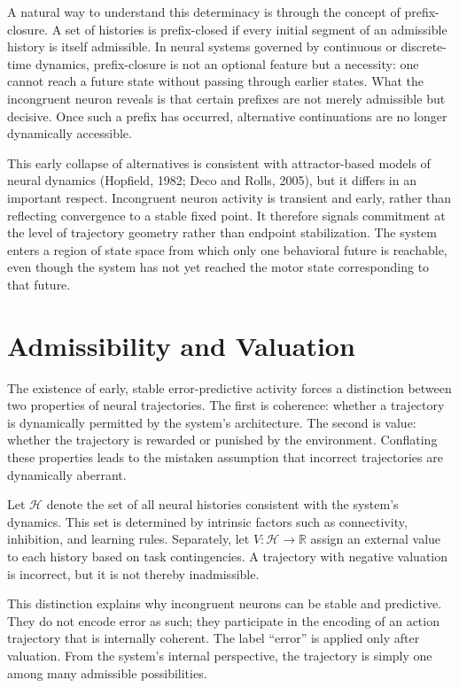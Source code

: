\documentclass[11pt]{article}
\newcommand{\histories}{\mathcal{H}}
\newcommand{\valuation}{V}
\begin{document}
A natural way to understand this determinacy is through the concept of prefix-closure. A set of histories is prefix-closed if every initial segment of an admissible history is itself admissible. In neural systems governed by continuous or discrete-time dynamics, prefix-closure is not an optional feature but a necessity: one cannot reach a future state without passing through earlier states. What the incongruent neuron reveals is that certain prefixes are not merely admissible but decisive. Once such a prefix has occurred, alternative continuations are no longer dynamically accessible.

This early collapse of alternatives is consistent with attractor-based models of neural dynamics (Hopfield, 1982; Deco and Rolls, 2005), but it differs in an important respect. Incongruent neuron activity is transient and early, rather than reflecting convergence to a stable fixed point. It therefore signals commitment at the level of trajectory geometry rather than endpoint stabilization. The system enters a region of state space from which only one behavioral future is reachable, even though the system has not yet reached the motor state corresponding to that future.

\section{Admissibility and Valuation}

The existence of early, stable error-predictive activity forces a distinction between two properties of neural trajectories. The first is coherence: whether a trajectory is dynamically permitted by the system’s architecture. The second is value: whether the trajectory is rewarded or punished by the environment. Conflating these properties leads to the mistaken assumption that incorrect trajectories are dynamically aberrant.

Let $\histories$ denote the set of all neural histories consistent with the system’s dynamics. This set is determined by intrinsic factors such as connectivity, inhibition, and learning rules. Separately, let $\valuation : \histories \to \mathbb{R}$ assign an external value to each history based on task contingencies. A trajectory with negative valuation is incorrect, but it is not thereby inadmissible.

This distinction explains why incongruent neurons can be stable and predictive. They do not encode error as such; they participate in the encoding of an action trajectory that is internally coherent. The label “error” is applied only after valuation. From the system’s internal perspective, the trajectory is simply one among many admissible possibilities.
\end{document}

